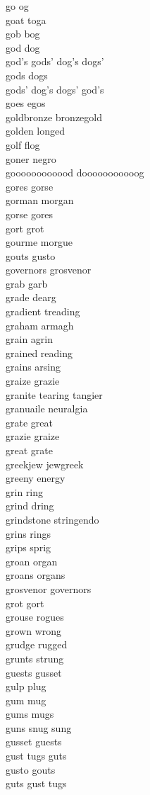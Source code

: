 go og\\
goat toga\\
gob bog\\
god dog\\
god's gods' dog's dogs'\\
gods dogs\\
gods' dog's dogs' god's\\
goes egos\\
goldbronze bronzegold\\
golden longed\\
golf flog\\
goner negro\\
goooooooooood dooooooooooog\\
gores gorse\\
gorman morgan\\
gorse gores\\
gort grot\\
gourme morgue\\
gouts gusto\\
governors grosvenor\\
grab garb\\
grade dearg\\
gradient treading\\
graham armagh\\
grain agrin\\
grained reading\\
grains arsing\\
graize grazie\\
granite tearing tangier\\
granuaile neuralgia\\
grate great\\
grazie graize\\
great grate\\
greekjew jewgreek\\
greeny energy\\
grin ring\\
grind dring\\
grindstone stringendo\\
grins rings\\
grips sprig\\
groan organ\\
groans organs\\
grosvenor governors\\
grot gort\\
grouse rogues\\
grown wrong\\
grudge rugged\\
grunts strung\\
guests gusset\\
gulp plug\\
gum mug\\
gums mugs\\
guns snug sung\\
gusset guests\\
gust tugs guts\\
gusto gouts\\
guts gust tugs\\


